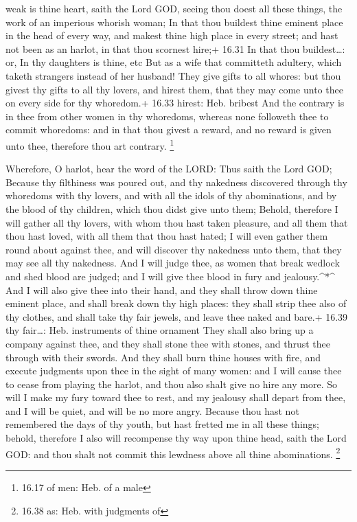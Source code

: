 weak is thine heart, saith the Lord GOD, seeing thou doest all these
things, the work of an imperious whorish woman;  In that
thou buildest thine eminent place in the head of every way, and makest
thine high place in every street; and hast not been as an harlot, in
that thou scornest hire;+ 16.31 In that thou buildest\ldots: or, In thy
daughters is thine, etc  But as a wife that committeth
adultery, which taketh strangers instead of her husband! 
They give gifts to all whores: but thou givest thy gifts to all thy
lovers, and hirest them, that they may come unto thee on every side for
thy whoredom.+ 16.33 hirest: Heb. bribest  And the contrary
is in thee from other women in thy whoredoms, whereas none followeth
thee to commit whoredoms: and in that thou givest a reward, and no
reward is given unto thee, therefore thou art contrary. \footnote{16.17
  of men: Heb. of a male}

 Wherefore, O harlot, hear the word of the LORD:
 Thus saith the Lord GOD; Because thy filthiness was poured
out, and thy nakedness discovered through thy whoredoms with thy lovers,
and with all the idols of thy abominations, and by the blood of thy
children, which thou didst give unto them;  Behold,
therefore I will gather all thy lovers, with whom thou hast taken
pleasure, and all them that thou hast loved, with all them that thou
hast hated; I will even gather them round about against thee, and will
discover thy nakedness unto them, that they may see all thy nakedness.
 And I will judge thee, as women that break wedlock and
shed blood are judged; and I will give thee blood in fury and
jealousy.\^{}*\^{}  And I will also give thee into their
hand, and they shall throw down thine eminent place, and shall break
down thy high places: they shall strip thee also of thy clothes, and
shall take thy fair jewels, and leave thee naked and bare.+ 16.39 thy
fair\ldots: Heb. instruments of thine ornament  They shall
also bring up a company against thee, and they shall stone thee with
stones, and thrust thee through with their swords.  And
they shall burn thine houses with fire, and execute judgments upon thee
in the sight of many women: and I will cause thee to cease from playing
the harlot, and thou also shalt give no hire any more.  So
will I make my fury toward thee to rest, and my jealousy shall depart
from thee, and I will be quiet, and will be no more angry. 
Because thou hast not remembered the days of thy youth, but hast fretted
me in all these things; behold, therefore I also will recompense thy way
upon thine head, saith the Lord GOD: and thou shalt not commit this
lewdness above all thine abominations. \footnote{16.38 as: Heb. with
  judgments of}

